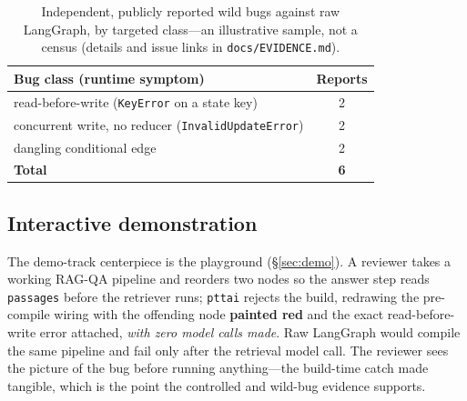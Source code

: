 \documentclass[11pt]{article}
\newcommand{\code}[1]{\texttt{#1}}
\begin{document}
\begin{table}[t]
  \centering
  \small
  \begin{tabular}{@{}p{}c@{}}
    \toprule
    \textbf{Bug class (runtime symptom)} & \textbf{Reports} \\
    \midrule
    read-before-write (\code{KeyError} on a state key) & 2 \\
    concurrent write, no reducer (\code{InvalidUpdateError}) & 2 \\
    dangling conditional edge & 2 \\
    \midrule
    \textbf{Total} & \textbf{6} \\
    \bottomrule
  \end{tabular}
  \caption{Independent, publicly reported wild bugs against raw LangGraph, by
  targeted class---an illustrative sample, not a census (details and issue links
  in \code{docs/EVIDENCE.md}).}
  \label{tab:wild}
\end{table}

\subsection{Interactive demonstration}
The demo-track centerpiece is the playground (\S\ref{sec:demo}). A reviewer takes
a working RAG-QA pipeline and reorders two nodes so the answer step reads
\code{passages} before the retriever runs; \code{pttai} rejects the build,
redrawing the pre-compile wiring with the offending node \textbf{painted red} and
the exact read-before-write error attached, \emph{with zero model calls made}.
Raw LangGraph would compile the same pipeline and fail only after the retrieval
model call. The reviewer sees the picture of the bug before running anything---the
build-time catch made tangible, which is the point the controlled and wild-bug
evidence supports.
\end{document}
